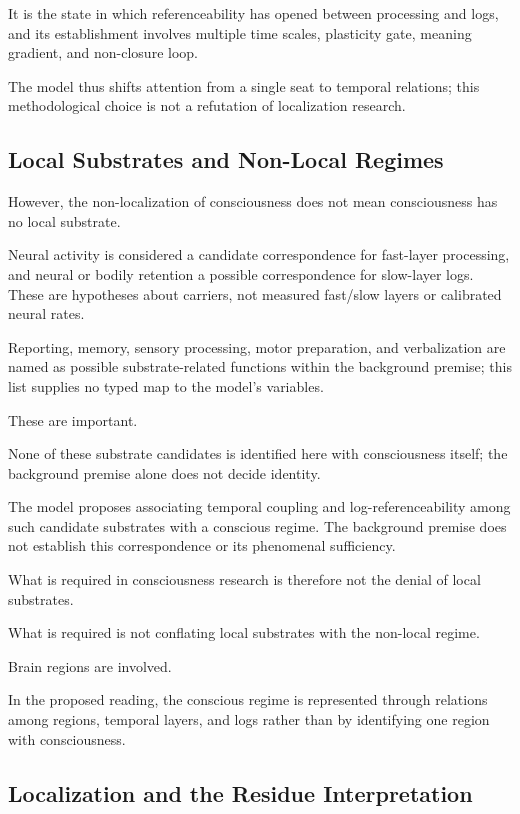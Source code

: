 It is the state in which referenceability has opened between processing and logs, and its establishment involves multiple time scales, plasticity gate, meaning gradient, and non-closure loop.

The model thus shifts attention from a single seat to temporal relations; this methodological choice is not a refutation of localization research.

\subsection{Local Substrates and Non-Local Regimes}


However, the non-localization of consciousness does not mean consciousness has no local substrate.

Neural activity is considered a candidate correspondence for fast-layer processing, and neural or bodily retention a possible correspondence for slow-layer logs. These are hypotheses about carriers, not measured fast/slow layers or calibrated neural rates.

Reporting, memory, sensory processing, motor preparation, and verbalization are named as possible substrate-related functions within the background premise; this list supplies no typed map to the model's variables.

These are important.

None of these substrate candidates is identified here with consciousness itself; the background premise alone does not decide identity.

The model proposes associating temporal coupling and log-referenceability among such candidate substrates with a conscious regime. The background premise does not establish this correspondence or its phenomenal sufficiency.

What is required in consciousness research is therefore not the denial of local substrates.

What is required is not conflating local substrates with the non-local regime.

Brain regions are involved.

In the proposed reading, the conscious regime is represented through relations among regions, temporal layers, and logs rather than by identifying one region with consciousness.

\subsection{Localization and the Residue Interpretation}


